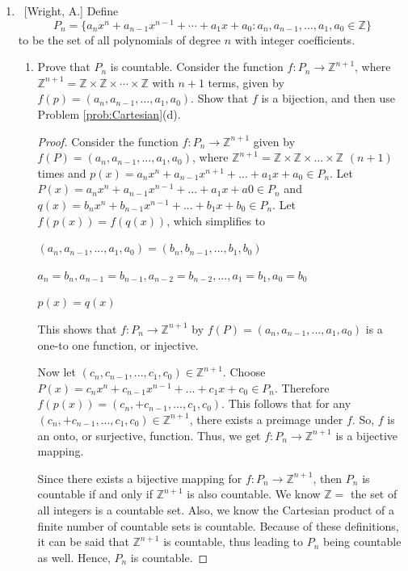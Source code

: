 \documentclass[10pt]{article}
\begin{document}
\begin{enumerate}
	
\item  ~[Wright, A.] Define $$P_n = \{ a_nx^n + a_{n-1}x^{n-1} + \cdots + a_1 x + a_0: a_n, a_{n-1}, \ldots, a_1, a_0 \in \mathbb{Z} \}$$ to be the set of all polynomials of degree $n$ with integer coefficients.

	\begin{enumerate}
	
	\item  Prove that $P_n$ is countable.  Consider the function $f: P_n \to \mathbb{Z}^{n+1}$, where $\mathbb{Z}^{n+1} = \mathbb{Z} \times \mathbb{Z} \times \cdots \times \mathbb{Z}$ with $n+1$ terms, given by $f(p) = (a_n, a_{n-1}, \ldots, a_1, a_0)$.  Show that $f$ is a bijection, and then use Problem \ref{prob:Cartesian}(d).

 \begin{proof}
 Consider the function $f: P_n \rightarrow \mathbb{Z}^{n+1}$ given by $f(P) = (a_n, a_{n-1}, ..., a_1, a_0)$, where $\mathbb{Z}^{n+1} = \mathbb{Z} \times \mathbb{Z} \times ... \times \mathbb{Z}$ $(n+1)$ times and $p(x) = a_nx^n + a_{n-1}x^{n+1} + ... + a_1x + a_0 \in P_n$.  Let $P(x) = a_nx^n + a_{n-1}x^{n-1}+...+a_1x+a0 \in P_n$ and $q(x) = b_nx^n + b_{n-1}x^{n-1}+...+b_1x+b_0 \in P_n$.  Let $f(p(x)) = f(q(x))$, which simplifies to 
 \begin{center}
     $(a_n, a_{n-1},...,a_1, a_0) = (b_n, b_{n-1},...,b_1,b_0)$
     
     $a_n = b_n, a_{n-1} = b_{n-1}, a_{n-2} = b_{n-2},...,a_1 = b_1, a_0 = b_0$
     
     $p(x) = q(x)$
 \end{center}
 This shows that $f:P_n \rightarrow \mathbb{Z}^{n+1}$ by $f(P) = (a_n, a_{n-1},...,a_1, a_0)$ is a one-to one function, or injective.
 \par \medskip
 Now let $(c_n, c_{n-1},...,c_1, c_0) \in \mathbb{Z}^{n+1}$. Choose $P(x) = c_nx^n+c_{n-1}x^{n-1}+...+c_1x+c_0 \in P_n$.  Therefore $f(p(x)) = (c_n, +c_{n-1},...,c_1,c_0)$.  This follows that for any $(c_n, +c_{n-1},...,c_1,c_0) \in \mathbb{Z}^{n+1}$, there exists a preimage under $f$.  So, $f$ is an onto, or surjective, function.  Thus, we get $f:P_n  \rightarrow \mathbb{Z}^{n+1}$ is a bijective mapping.
 \par \medskip
 Since there exists a bijective mapping for $f:P_n  \rightarrow \mathbb{Z}^{n+1}$, then $P_n$ is countable if and only if $\mathbb{Z}^{n+1}$ is also countable.  We know $\mathbb{Z}=$ the set of all integers is a countable set.  Also, we know the Cartesian product of a finite number of countable sets is countable.  Because of these definitions, it can be said that $\mathbb{Z}^{n+1}$ is countable, thus leading to $P_n$ being countable as well.  Hence, $P_n$ is countable.
 \end{proof}
 

\end{enumerate}
\end{enumerate}
\end{document}
